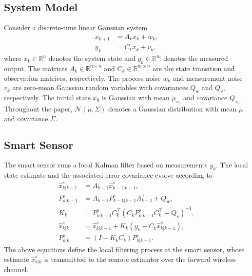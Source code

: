 \documentclass[letterpaper, 10 pt, conference]{ieeeconf}
\begin{document}
\subsection{System Model}
\label{subsec:system_model}
Consider a discrete-time  linear Gaussian system
\begin{subequations}
\begin{align}
    x_{k+1} &= A_k x_k + w_k,\\
    y_k &= C_k x_k + v_k,
\end{align}
\end{subequations}
where $x_k \in \mathbb{R}^n$ denotes the system state  and $y_k \in \mathbb{R}^m$ denotes the measured output. The matrices $A_k\in \mathbb{R}^{n\times n}$ and $C_k\in \mathbb{R}^{m\times n}$ are the state transition and observation matrices, respectively.
The process noise $w_k$ and measurement noise $v_k$ are zero-mean Gaussian random variables with covariances $Q_w$ and $Q_v$, respectively. The initial state $x_0$ is Gaussian with mean $\mu_{x_0}$ and covariance $Q_{x_0}$.
 Throughout the paper, $\mathcal{N}(\mu,\Sigma)$ denotes a Gaussian distribution with mean $\mu$ and covariance $\Sigma$.





\subsection{Smart Sensor}
\label{subsec:sensor}
The smart sensor runs a local Kalman filter based on  measurements $y_k$. 
The local state estimate and the associated error covariance evolve according to
\begin{subequations}
\begin{align}
    \hat{x}^s_{k|k-1}&=A_{k-1}\hat{x}^s_{k-1|k-1},\\
    P^s_{k|k-1}&= A_{k-1}P^s_{k-1|k-1}A_{k-1}^\top+Q_w,\\
    K_k&=P^s_{k|k-1}C_k^\top(C_kP^s_{k|k-1}C_k^\top+Q_v)^{-1},\\
    \hat{x}^s_{k|k}&=\hat{x}^s_{k|k-1}+K_k(y_k-C_k\hat{x}^s_{k|k-1}),\\
    P^s_{k|k}&=(I-K_kC_k)P^s_{k|k-1}.
\end{align}\end{subequations}
The above equations define the local filtering process at the smart sensor, whose estimate $\hat x^s_{k|k}$ is transmitted to the remote estimator over the forward wireless channel.
\end{document}
